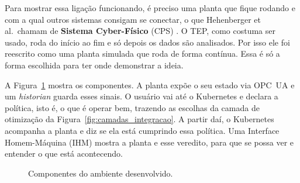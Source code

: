 Para mostrar essa ligação funcionando, é preciso uma planta que fique rodando e com a qual outros sistemas consigam se conectar, o que Hehenberger et al.\ chamam de \textbf{Sistema Cyber-Físico} (CPS) \cite{Hehenberger2016}. O TEP, como costuma ser usado, roda do início ao fim e só depois os dados são analisados. Por isso ele foi reescrito como uma planta simulada que roda de forma contínua. Essa é só a forma escolhida para ter onde demonstrar a ideia.

A Figura~\ref{fig:componentes} mostra os componentes. A planta expõe o seu estado via OPC~UA \cite{IEC62541_1} e um \textit{historian} guarda esses sinais. O usuário vai até o Kubernetes e declara a política, isto é, o que é operar bem, trazendo as escolhas da camada de otimização da Figura~\ref{fig:camadas_integracao}. A partir daí, o Kubernetes acompanha a planta e diz se ela está cumprindo essa política. Uma Interface Homem-Máquina (IHM) mostra a planta e esse veredito, para que se possa ver e entender o que está acontecendo.

\begin{figure}[htbp]
\centering
{}
\caption{Componentes do ambiente desenvolvido.}
\label{fig:componentes}
\end{figure}


